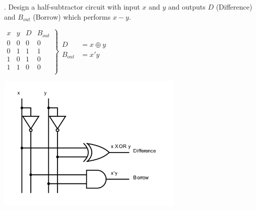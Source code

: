 \documentclass[12pt]{book}
\newenvironment{indented} {
	\begin{list}{}{\setlength{\leftmargin}{5mm}}
	\item[]
}{\end{list}}
\begin{document}
	. Design a half-subtractor circuit with input $x$ and $y$ and outputs $D$ (Difference) and $B_{out}$ (Borrow)
	which performs $x-y$.
	\begin{indented}
		$\left.\begin{array}{c|c||c|c}
				x & y & D & B_{out} \\
				\hline
				0 & 0 & 0 & 0 \\
				0 & 1 & 1 & 1 \\
				1 & 0 & 1 & 0 \\
				1 & 1 & 0 & 0 \\
		\end{array}
		\right\}
		\begin{aligned}
			D &= x \oplus y\\
			B_{out} &= x'y\\
		\end{aligned}$

		\includegraphics[width=3.5in]{q1_half_subtractor}
	\end{indented}
\end{document}
